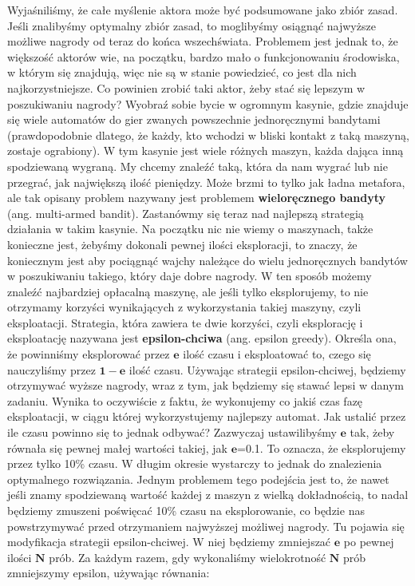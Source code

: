 Wyjaśniliśmy, że całe myślenie aktora może być podsumowane jako zbiór zasad. Jeśli znalibyśmy optymalny zbiór zasad, to moglibyśmy osiągnąć najwyższe możliwe nagrody od teraz do końca wszechświata. Problemem jest jednak to, że większość aktorów wie, na początku, bardzo mało o funkcjonowaniu środowiska, w którym się znajdują, więc nie są w stanie powiedzieć, co jest dla nich najkorzystniejsze. Co powinien zrobić taki aktor, żeby stać się lepszym w poszukiwaniu nagrody? Wyobraź sobie bycie w ogromnym kasynie, gdzie znajduje się wiele automatów do gier zwanych powszechnie jednoręcznymi bandytami (prawdopodobnie dlatego, że każdy, kto wchodzi w bliski kontakt z taką maszyną, zostaje ograbiony). W tym kasynie jest wiele różnych maszyn, każda dająca inną spodziewaną wygraną. My chcemy znaleźć taką, która da nam wygrać lub nie przegrać, jak największą ilość pieniędzy. Może brzmi to tylko jak ładna metafora, ale tak opisany problem nazywany jest problemem \textbf{wieloręcznego bandyty} (ang. multi-armed bandit). Zastanówmy się teraz nad najlepszą strategią działania w takim kasynie. Na początku nic nie wiemy o maszynach, także konieczne jest, żebyśmy dokonali pewnej ilości eksploracji, to znaczy, że koniecznym jest aby pociągnąć wajchy należące do wielu jednoręcznych bandytów w poszukiwaniu takiego, który daje dobre nagrody. W ten sposób możemy znaleźć najbardziej opłacalną maszynę, ale jeśli tylko eksplorujemy, to nie otrzymamy korzyści wynikających z wykorzystania takiej maszyny, czyli eksploatacji. Strategia, która zawiera te dwie korzyści, czyli eksplorację i eksploatację nazywana jest \textbf{epsilon-chciwa} (ang. epsilon greedy). Określa ona, że powinniśmy eksplorować przez $\boldsymbol{e}$ ilość czasu i eksploatować to, czego się nauczyliśmy przez $\boldsymbol{1-e}$ ilość czasu. Używając strategii epsilon-chciwej, będziemy otrzymywać wyższe nagrody, wraz z tym, jak będziemy się stawać lepsi w danym zadaniu. Wynika to oczywiście z faktu, że wykonujemy co jakiś czas fazę eksploatacji, w ciągu której wykorzystujemy najlepszy automat. Jak ustalić przez ile czasu powinno się to jednak odbywać? Zazwyczaj ustawilibyśmy $\boldsymbol{e}$ tak, żeby równała się pewnej małej wartości takiej, jak $\boldsymbol{e}$=0.1. To oznacza, że eksplorujemy przez tylko 10\% czasu. W długim okresie wystarczy to jednak do znalezienia optymalnego rozwiązania. Jednym problemem tego podejścia jest to, że nawet jeśli znamy spodziewaną wartość każdej z maszyn z wielką dokładnością, to nadal będziemy zmuszeni poświęcać 10\% czasu na eksplorowanie, co będzie nas powstrzymywać przed otrzymaniem najwyższej możliwej nagrody. Tu pojawia się modyfikacja strategii epsilon-chciwej. W niej będziemy zmniejszać $\boldsymbol{e}$ po pewnej ilości $\boldsymbol{N}$ prób. Za każdym razem, gdy wykonaliśmy wielokrotność $\boldsymbol{N}$ prób zmniejszymy epsilon, używając równania:

